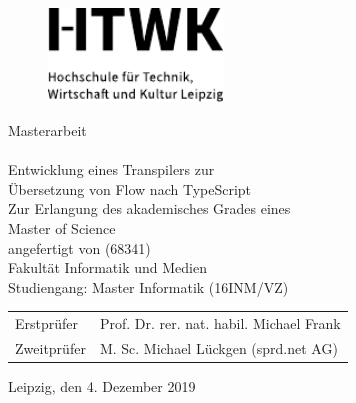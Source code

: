 \makeatletter
\begin{titlepage}
  \vspace{1cm}

  \begin{figure}[h!]
    \centering
    \includegraphics[height=2.5cm]{src/0_Frontmatter/htwk.pdf}
  \end{figure}

  \begin{center}
    \vspace{1cm}

    \begin{onehalfspacing}
      {\Large Masterarbeit} \\[8ex]
      {\huge\textbf{\@title}} \\[5ex]
      {\LARGE\libertineSB Entwicklung eines Transpilers zur\\[.5ex]Übersetzung von Flow nach TypeScript} \\[8ex]
      \large
      Zur Erlangung des akademisches Grades eines \\
      Master of Science \\[5ex]
      \vfill
      {\libertineSB angefertigt von \@author{ }(68341)}\\[5ex]
      \vfill
      Fakultät Informatik und Medien\\
      Studiengang: Master Informatik (16INM/VZ)\\[5ex]
      \vfill
      \begin{tabular}{ll}
        Erstprüfer & Prof. Dr. rer. nat. habil. Michael Frank \\
        Zweitprüfer & M. Sc. Michael Lückgen (sprd.net AG) \\
      \end{tabular}
      \vspace{5ex}
      \vfill
      Leipzig, den 4. Dezember 2019
    \end{onehalfspacing}
  \end{center}
\end{titlepage}
\makeatother
